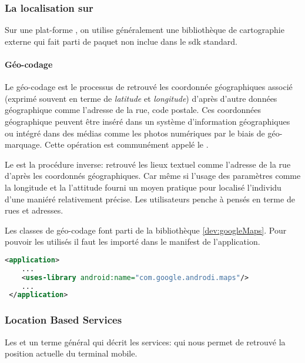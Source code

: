 \subsubsection{La localisation sur \android{}}%
Sur une plat-forme \android{}, on utilise généralement une bibliothèque de cartographie externe  qui fait parti de paquet  non inclue dans le \gls{sdk} standard.

\paragraph{Géo-codage}
Le géo-codage est le processus de retrouvé les coordonnée géographiques associé (exprimé souvent en terme de \textit{latitude} et \textit{longitude}) d'après d'autre données géographique comme l'adresse de la rue, code postale. Ces coordonnées géographique peuvent être inséré dans un système d'information géographiques ou intégré dans des médias comme les photos numériques par le biais de géo-marquage. Cette opération est communément appelé le .

Le  est la procédure inverse: retrouvé les lieux textuel comme l'adresse de la rue d'après les coordonnés géographiques. Car même si l'usage des paramètres comme la longitude et la l'attitude fourni un moyen pratique pour localisé l'individu d'une maniéré relativement précise. Les utilisateurs penche à pensés en terme de rues et adresses.
\cite{wiki:geocoding}

Les classes de géo-codage font parti de la bibliothèque  \ref{dev:googleMaps}. Pour pouvoir les utilisés il faut les importé dans le manifest de l'application.
 \begin{lstlisting}[language=xml, caption=Importé la bibliothèque GoogleMaps.]
 <application>
    ...
    <uses-library android:name="com.google.androdi.maps"/>
    ...
 </application>
 \end{lstlisting}
\subsubsection{Location Based Services}%
Les  et un terme général qui décrit les services: qui nous permet de retrouvé la position actuelle du terminal mobile.

